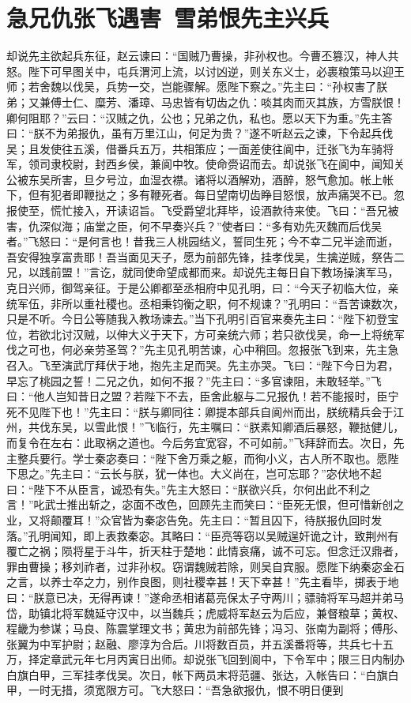 \chapter{急兄仇张飞遇害~雪弟恨先主兴兵}

却说先主欲起兵东征，赵云谏曰：“国贼乃曹操，非孙权也。今曹丕篡汉，神人共怒。陛下可早图关中，屯兵渭河上流，以讨凶逆，则关东义士，必裹粮策马以迎王师；若舍魏以伐吴，兵势一交，岂能骤解。愿陛下察之。”先主曰：“孙权害了朕弟；又兼傅士仁、糜芳、潘璋、马忠皆有切齿之仇：啖其肉而灭其族，方雪朕恨！卿何阻耶？”云曰：“汉贼之仇，公也；兄弟之仇，私也。愿以天下为重。”先主答曰：“朕不为弟报仇，虽有万里江山，何足为贵？”遂不听赵云之谏，下令起兵伐吴；且发使往五溪，借番兵五万，共相策应；一面差使往阆中，迁张飞为车骑将军，领司隶校尉，封西乡侯，兼阆中牧。使命赍诏而去。却说张飞在阆中，闻知关公被东吴所害，旦夕号泣，血湿衣襟。诸将以酒解劝，酒醉，怒气愈加。帐上帐下，但有犯者即鞭挞之；多有鞭死者。每日望南切齿睁目怒恨，放声痛哭不已。忽报使至，慌忙接入，开读诏旨。飞受爵望北拜毕，设酒款待来使。飞曰：“吾兄被害，仇深似海；庙堂之臣，何不早奏兴兵？”使者曰：“多有劝先灭魏而后伐吴者。”飞怒曰：“是何言也！昔我三人桃园结义，誓同生死；今不幸二兄半途而逝，吾安得独享富贵耶！吾当面见天子，愿为前部先锋，挂孝伐吴，生擒逆贼，祭告二兄，以践前盟！”言讫，就同使命望成都而来。却说先主每日自下教场操演军马，克日兴师，御驾亲征。于是公卿都至丞相府中见孔明，曰：“今天子初临大位，亲统军伍，非所以重社稷也。丞相秉钧衡之职，何不规谏？”孔明曰：“吾苦谏数次，只是不听。今日公等随我入教场谏去。”当下孔明引百官来奏先主曰：“陛下初登宝位，若欲北讨汉贼，以伸大义于天下，方可亲统六师；若只欲伐吴，命一上将统军伐之可也，何必亲劳圣驾？”先主见孔明苦谏，心中稍回。忽报张飞到来，先主急召入。飞至演武厅拜伏于地，抱先主足而哭。先主亦哭。飞曰：“陛下今日为君，早忘了桃园之誓！二兄之仇，如何不报？”先主曰：“多官谏阻，未敢轻举。”飞曰：“他人岂知昔日之盟？若陛下不去，臣舍此躯与二兄报仇！若不能报时，臣宁死不见陛下也！”先主曰：“朕与卿同往：卿提本部兵自阆州而出，朕统精兵会于江州，共伐东吴，以雪此恨！”飞临行，先主嘱曰：“朕素知卿酒后暴怒，鞭挞健儿，而复令在左右：此取祸之道也。今后务宜宽容，不可如前。”飞拜辞而去。次日，先主整兵要行。学士秦宓奏曰：“陛下舍万乘之躯，而徇小义，古人所不取也。愿陛下思之。”先主曰：“云长与朕，犹一体也。大义尚在，岂可忘耶？”宓伏地不起曰：“陛下不从臣言，诚恐有失。”先主大怒曰：“朕欲兴兵，尔何出此不利之言！”叱武士推出斩之，宓面不改色，回顾先主而笑曰：“臣死无恨，但可惜新创之业，又将颠覆耳！”众官皆为秦宓告免。先主曰：“暂且囚下，待朕报仇回时发落。”孔明闻知，即上表救秦宓。其略曰：“臣亮等窃以吴贼逞奸诡之计，致荆州有覆亡之祸；陨将星于斗牛，折天柱于楚地：此情哀痛，诚不可忘。但念迁汉鼎者，罪由曹操；移刘祚者，过非孙权。窃谓魏贼若除，则吴自宾服。愿陛下纳秦宓金石之言，以养士卒之力，别作良图，则社稷幸甚！天下幸甚！”先主看毕，掷表于地曰：“朕意已决，无得再谏！”遂命丞相诸葛亮保太子守两川；骠骑将军马超并弟马岱，助镇北将军魏延守汉中，以当魏兵；虎威将军赵云为后应，兼督粮草；黄权、程畿为参谋；马良、陈震掌理文书；黄忠为前部先锋；冯习、张南为副将；傅彤、张翼为中军护尉；赵融、廖淳为合后。川将数百员，并五溪番将等，共兵七十五万，择定章武元年七月丙寅日出师。却说张飞回到阆中，下令军中；限三日内制办白旗白甲，三军挂孝伐吴。次日，帐下两员末将范疆、张达，入帐告曰：“白旗白甲，一时无措，须宽限方可。飞大怒曰：“吾急欲报仇，恨不明日便到